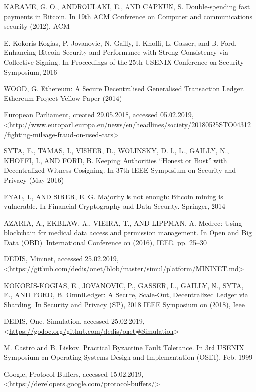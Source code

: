 \begin{thebibliography}{9}
 KARAME, G. O., ANDROULAKI, E., AND CAPKUN, S. Double-spending fast payments in Bitcoin. In 19th ACM Conference on Computer and communications security (2012), ACM

 E. Kokoris-Kogias, P. Jovanovic, N. Gailly, I. Khoffi, L. Gasser, and B. Ford. Enhancing Bitcoin Security and Performance with Strong
Consistency via Collective Signing. In Proceedings of the 25th USENIX
Conference on Security Symposium, 2016

 WOOD, G. Ethereum: A Secure Decentralised Generalised Transaction Ledger. Ethereum Project Yellow Paper (2014)

 European Parliament, created 29.05.2018, accessed 05.02.2019, <\url{http://www.europarl.europa.eu/news/en/headlines/society/20180525STO04312/fighting-mileage-fraud-on-used-cars}>

 SYTA, E., TAMAS, I., VISHER, D., WOLINSKY,
D. I., L., GAILLY, N., KHOFFI, I., AND FORD, B.
Keeping Authorities “Honest or Bust” with Decentralized
Witness Cosigning. In 37th IEEE Symposium
on Security and Privacy (May 2016)

 EYAL, I., AND SIRER, E. G. Majority is not enough: Bitcoin mining is vulnerable. In Financial Cryptography and Data Security. Springer, 2014

 AZARIA, A., EKBLAW, A., VIEIRA, T., AND LIPPMAN, A. Medrec: Using blockchain for medical data access and permission management. In
Open and Big Data (OBD), International Conference on (2016), IEEE, pp. 25–30

 DEDIS, Mininet, accessed 25.02.2019, <\url{https://github.com/dedis/onet/blob/master/simul/platform/MININET.md}>

 KOKORIS-KOGIAS, E., JOVANOVIC, P., GASSER, L., GAILLY, N., SYTA, E., AND FORD, B. OmniLedger: A Secure, Scale-Out, Decentralized Ledger via Sharding. In Security and Privacy (SP), 2018 IEEE Symposium on (2018), Ieee

 DEDIS, Onet Simulation, accessed 25.02.2019, <\url{https://godoc.org/github.com/dedis/onet\#Simulation}>

 M. Castro and B. Liskov. Practical Byzantine Fault Tolerance. In 3rd USENIX Symposium on Operating Systems Design and Implementation
(OSDI), Feb. 1999

 Google, Protocol Buffers, accessed 15.02.2019,
<\url{https://developers.google.com/protocol-buffers/}>


\end{thebibliography}
